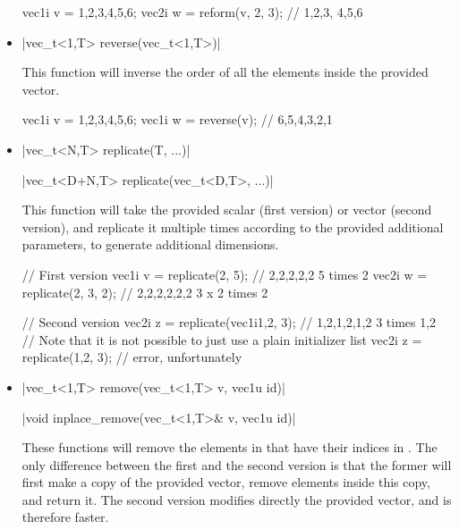 \documentclass[12pt]{report}
\newenvironment{example}
{
    \begin{mdframed}[style=example,frametitle={Example}]
}
{
    \end{mdframed}
}
\begin{document}
\begin{itemize}
\begin{example}
\begin{cppcode}
vec1i v = {1,2,3,4,5,6};
vec2i w = reform(v, 2, 3); // {{1,2,3}, {4,5,6}}
\end{cppcode}
\end{example}

\item \cppinline|vec_t<1,T> reverse(vec_t<1,T>)| 

This function will inverse the order of all the elements inside the provided vector.

\begin{example}
\begin{cppcode}
vec1i v = {1,2,3,4,5,6};
vec1i w = reverse(v); // {6,5,4,3,2,1}
\end{cppcode}
\end{example}

\item \cppinline|vec_t<N,T>   replicate(T, ...)| 

      \cppinline|vec_t<D+N,T> replicate(vec_t<D,T>, ...)|


This function will take the provided scalar (first version) or vector (second version), and replicate it multiple times according to the provided additional parameters, to generate additional dimensions.

\begin{example}
\begin{cppcode}
// First version
vec1i v = replicate(2, 5); // {2,2,2,2,2} 5 times 2
vec2i w = replicate(2, 3, 2); // {{2,2},{2,2},{2,2}} 3 x 2 times 2

// Second version
vec2i z = replicate(vec1i{1,2}, 3); // {{1,2},{1,2},{1,2}} 3 times {1,2}
// Note that it is not possible to just use a plain initializer list
vec2i z = replicate({1,2}, 3); // error, unfortunately
\end{cppcode}
\end{example}

\item \cppinline|vec_t<1,T> remove(vec_t<1,T> v, vec1u id)| 

\cppinline|void inplace_remove(vec_t<1,T>& v, vec1u id)| 

These functions will remove the elements in  that have their indices in . The only difference between the first and the second version is that the former will first make a copy of the provided vector, remove elements inside this copy, and return it. The second version modifies directly the provided vector, and is therefore faster.


\end{itemize}
\end{document}
